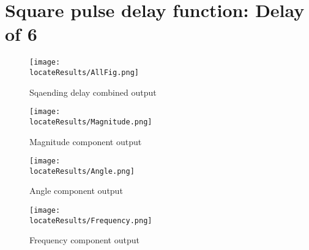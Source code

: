 \newpage
\section{Square pulse  delay function: Delay of 6}

\begin{figure}[hb]
    \texttt{[image: \\locateResults/AllFig.png]}    
    \caption{Sqaending delay combined output}
    \label{fig:PMUsim-Sqa6-allfig}
\end{figure}


     \begin{figure}
 
    \texttt{[image: \\locateResults/Magnitude.png]}    
         \label{fig:PMUsim-Sqa6Mag}
        \caption{Magnitude component output}
 
\end{figure}

     \begin{figure}
 
   \texttt{[image: \\locateResults/Angle.png]}    
         \label{fig:PMUsim-Sqa6Ang}
        \caption{Angle component output}
 
\end{figure}

     \begin{figure}
 
   \texttt{[image: \\locateResults/Frequency.png]}    
         \label{fig:PMUsim-Sqa6Freq}
        \caption{Frequency component output}
 
\end{figure}


